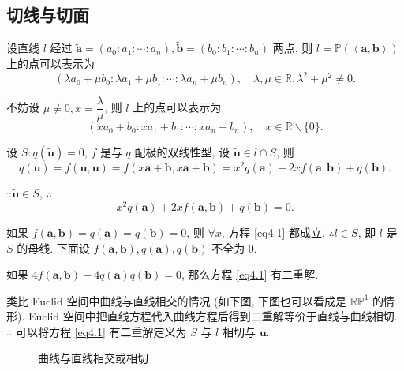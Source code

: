 \documentclass{ctexart}
\begin{document}
\subsection{切线与切面}
设直线 $l$ 经过 $\tilde{\boldsymbol{a}}=(a_0:a_1:\cdots:a_n),\tilde{\boldsymbol{b}}=(b_0:b_1:\cdots:b_n)$ 两点, 则 $l=\mathbb{P}(\left<\boldsymbol{a},\boldsymbol{b}\right>)$ 上的点可以表示为
\[(\lambda a_0+\mu b_0:\lambda a_1+\mu b_1:\cdots:\lambda a_n+\mu b_n),\quad\lambda,\mu\in\mathbb{R},\lambda^2+\mu^2\neq0.\]

不妨设 $\mu\neq0,x=\dfrac{\lambda}{\mu}$, 则 $l$ 上的点可以表示为
\[(xa_0+b_0:xa_1+b_1:\cdots:xa_n+b_n),\quad x\in\mathbb{R}\backslash\{0\}.\]

设 $S:q(\tilde{\boldsymbol{u}})=0$, $f$ 是与 $q$ 配极的双线性型, 设 $\tilde{\boldsymbol{u}}\in l\cap S$, 则
\[q(\boldsymbol{u})=f(\boldsymbol{u},\boldsymbol{u})=f(x\boldsymbol{a}+\boldsymbol{b},x\boldsymbol{a}+\boldsymbol{b})=x^2q(\boldsymbol{a})+2xf(\boldsymbol{a},\boldsymbol{b})+q(\boldsymbol{b}).\]

$\because\tilde{\boldsymbol{u}}\in S$, $\therefore$
\begin{equation}\label{eq4.1}
    x^2q(\boldsymbol{a})+2xf(\boldsymbol{a},\boldsymbol{b})+q(\boldsymbol{b})=0.
\end{equation}

如果 $f(\boldsymbol{a},\boldsymbol{b})=q(\boldsymbol{a})=q(\boldsymbol{b})=0$, 则 $\forall x$, 方程 \ref{eq4.1} 都成立. $\therefore l\in S$, 即 $l$ 是 $S$ 的母线. 下面设 $f(\boldsymbol{a},\boldsymbol{b}),q(\boldsymbol{a}),q(\boldsymbol{b})$ 不全为 $0$.

如果 $4f(\boldsymbol{a},\boldsymbol{b})-4q(\boldsymbol{a})q(\boldsymbol{b})=0$, 那么方程 \ref{eq4.1} 有二重解.

类比 Euclid 空间中曲线与直线相交的情况 (如下图, 下图也可以看成是 $\mathbb{RP}^1$ 的情形). Euclid 空间中把直线方程代入曲线方程后得到二重解等价于直线与曲线相切. $\therefore$ 可以将方程 \ref{eq4.1} 有二重解定义为 $S$ 与 $l$ 相切与 $\tilde{\boldsymbol{u}}$.
\begin{figure}[h!]
    \centering
    \caption{曲线与直线相交或相切}
\end{figure}
\end{document}
